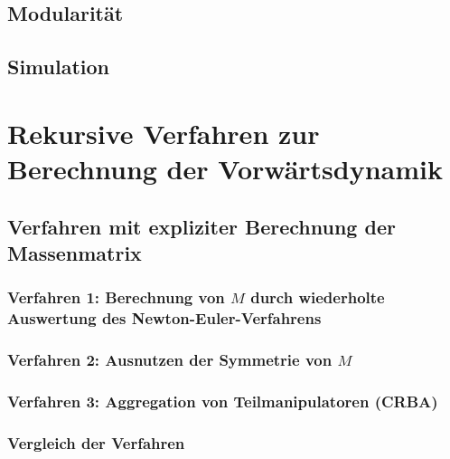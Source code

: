 \documentclass[a4paper, 11pt, accentcolor = tud3b]{tudreport}
\begin{document}
			\subsection{Modularität} %

			\subsection{Simulation} %

		\section{Rekursive Verfahren zur Berechnung der Vorwärtsdynamik} %

			\subsection{Verfahren mit expliziter Berechnung der Massenmatrix} %

				\subsubsection{Verfahren 1: Berechnung von \(M\) durch wiederholte Auswertung des Newton-Euler-Verfahrens} %

				\subsubsection{Verfahren 2: Ausnutzen der Symmetrie von \(M\)} %

				\subsubsection{Verfahren 3: Aggregation von Teilmanipulatoren (CRBA)} %

				\subsubsection{Vergleich der Verfahren} %
\end{document}
